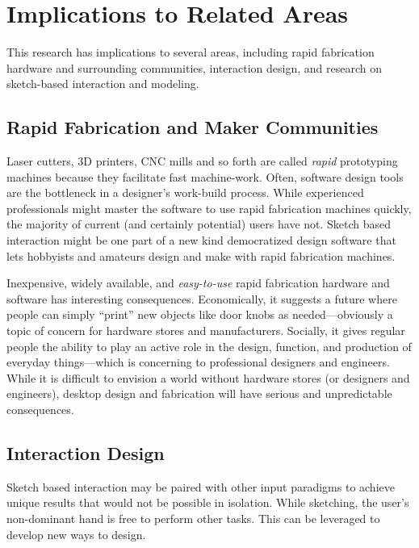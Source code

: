 \section{Implications to Related Areas}

This research has implications to several areas, including rapid
fabrication hardware and surrounding communities, interaction design,
and research on sketch-based interaction and modeling.

\subsection{Rapid Fabrication and Maker Communities}

Laser cutters, 3D printers, CNC mills and so forth are called
\textit{rapid} prototyping machines because they facilitate fast
machine-work. Often, software design tools are the bottleneck in a
designer's work-build process. While experienced professionals might
master the software to use rapid fabrication machines quickly, the
majority of current (and certainly potential) users have not. Sketch
based interaction might be one part of a new kind democratized design
software that lets hobbyists and amateurs design and make with rapid
fabrication machines.

Inexpensive, widely available, and \textit{easy-to-use} rapid
fabrication hardware and software has interesting
consequences. Economically, it suggests a future where people can
simply ``print'' new objects like door knobs as needed---obviously a
topic of concern for hardware stores and manufacturers. Socially, it
gives regular people the ability to play an active role in the design,
function, and production of everyday things---which is concerning to
professional designers and engineers. While it is difficult to
envision a world without hardware stores (or designers and engineers),
desktop design and fabrication will have serious and unpredictable
consequences.

\subsection{Interaction Design}

Sketch based interaction may be paired with other input paradigms to
achieve unique results that would not be possible in isolation. While
sketching, the user's non-dominant hand is free to perform other
tasks. This can be leveraged to develop new ways to design. 

